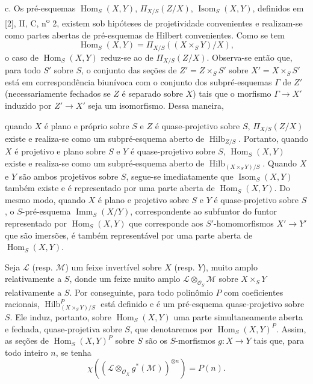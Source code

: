 \documentclass[11pt,twoside,openany]{book}
\numberwithin{equation}{section}
\newcommand{\src}[1]{%
  \phantomsection\hypertarget{src:#1}{}%
  \marginpar{\raggedleft\footnotesize\sffamily #1}%
}
\theoremstyle{plain}
\theoremstyle{definition}
\theoremstyle{remark}
\newcommand{\FgaUnitKey}{frontmatter}
\renewcommand{\src}[1]{%
  \phantomsection\hypertarget{src:\FgaUnitKey:#1}{}%
  \marginpar{\raggedleft\footnotesize\sffamily #1}%
}
\begin{document}
\medskip
\noindent c. Os pré-esquemas $\operatorname{Hom}_S(X,Y)$,
$\Pi_{X/S}(Z/X)$, $\operatorname{Isom}_S(X,Y)$, definidos em [2], II, C,
n\textsuperscript{o} 2, existem sob hipóteses de projetividade convenientes e
realizam-se como partes abertas de pré-esquemas de Hilbert convenientes. Como se
tem
\[
\operatorname{Hom}_S(X,Y)=\Pi_{X/S}((X\times_SY)/X),
\]
o caso de $\operatorname{Hom}_S(X,Y)$ reduz-se ao de $\Pi_{X/S}(Z/X)$.
Observa-se então que, para todo $S'$ sobre $S$, o conjunto das seções de
$Z'=Z\times_SS'$ sobre $X'=X\times_SS'$ está em correspondência biunívoca com
o conjunto dos subpré-esquemas $\Gamma$ de $Z'$ (necessariamente fechados se
$Z$ é separado sobre $X$) tais que o morfismo $\Gamma\longrightarrow X'$
induzido por $Z'\longrightarrow X'$ seja um isomorfismo. Dessa maneira,
\src{268}
quando $X$ é plano e próprio sobre $S$ e $Z$ é quase-projetivo sobre $S$,
$\Pi_{X/S}(Z/X)$ existe e realiza-se como um subpré-esquema aberto de
$\operatorname{Hilb}_{Z/S}$. Portanto, quando $X$ é projetivo e plano sobre
$S$ e $Y$ é quase-projetivo sobre $S$, $\operatorname{Hom}_S(X,Y)$ existe e
realiza-se como um subpré-esquema aberto de
$\operatorname{Hilb}_{(X\times_SY)/S}$. Quando $X$ e $Y$ são ambos projetivos
sobre $S$, segue-se imediatamente que $\operatorname{Isom}_S(X,Y)$ também
existe e é representado por uma parte aberta de
$\operatorname{Hom}_S(X,Y)$. Do mesmo modo, quando $X$ é plano e projetivo
sobre $S$ e $Y$ é quase-projetivo sobre $S$, o $S$-pré-esquema
$\operatorname{Imm}_S(X/Y)$, correspondente ao subfuntor do funtor representado
por $\operatorname{Hom}_S(X,Y)$ que corresponde aos $S'$-homomorfismos
$X'\longrightarrow Y'$ que são imersões, é também representável por uma
parte aberta de $\operatorname{Hom}_S(X,Y)$.

Seja $\mathcal L$ (resp. $\mathcal M$) um feixe invertível sobre $X$ (resp.
$Y$), muito amplo relativamente a $S$, donde um feixe muito amplo
$\mathcal L\otimes_{\mathcal O_S}\mathcal M$ sobre $X\times_SY$ relativamente a
$S$. Por conseguinte, para todo polinômio $P$ com coeficientes racionais,
$\operatorname{Hilb}^P_{(X\times_SY)/S}$ está definido e é um pré-esquema
quase-projetivo sobre $S$. Ele induz, portanto, sobre
$\operatorname{Hom}_S(X,Y)$ uma parte simultaneamente aberta e fechada,
quase-projetiva sobre $S$, que denotaremos por
$\operatorname{Hom}_S(X,Y)^P$. Assim, as seções de
$\operatorname{Hom}_S(X,Y)^P$ sobre $S$ são os $S$-morfismos
$g:X\longrightarrow Y$ tais que, para todo inteiro $n$, se tenha
\[
\chi\!\left(\left(\mathcal L\otimes_{\mathcal O_X}g^*(\mathcal M)\right)^{
\otimes n}\right)=P(n).
\]
\end{document}
